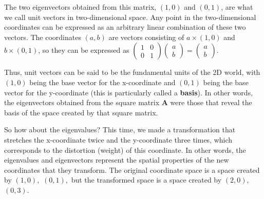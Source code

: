 \documentclass{ltjsbook}
\begin{document}
The two eigenvectors obtained from this matrix, $(1,0)$ and $(0,1)$, are what we call unit vectors in two-dimensional space. Any point in the two-dimensional coordinates can be expressed as an arbitrary linear combination of these two vectors. The coordinates $(a,b)$ are vectors consisting of $a\times(1,0)$ and $b\times(0,1)$, so they can be expressed as $\begin{pmatrix}1 & 0\\0 & 1\end{pmatrix}\begin{pmatrix}a\\b\end{pmatrix}=\begin{pmatrix}a\\b\end{pmatrix}$.

Thus, unit vectors can be said to be the fundamental units of the 2D world, with $(1,0)$ being the base vector for the x-coordinate and $(0,1)$ being the base vector for the y-coordinate (this is particularly called a \textbf{basis}). In other words, the eigenvectors obtained from the square matrix $\bm{A}$ were those that reveal the basis of the space created by that square matrix.

So how about the eigenvalues? This time, we made a transformation that stretches the x-coordinate twice and the y-coordinate three times, which corresponds to the distortion (weight) of this coordinate. In other words, the eigenvalues and eigenvectors represent the spatial properties of the new coordinates that they transform. The original coordinate space is a space created by $(1,0),$ $(0,1),$ but the transformed space is a space created by $(2,0),$ $(0,3).$
\end{document}
